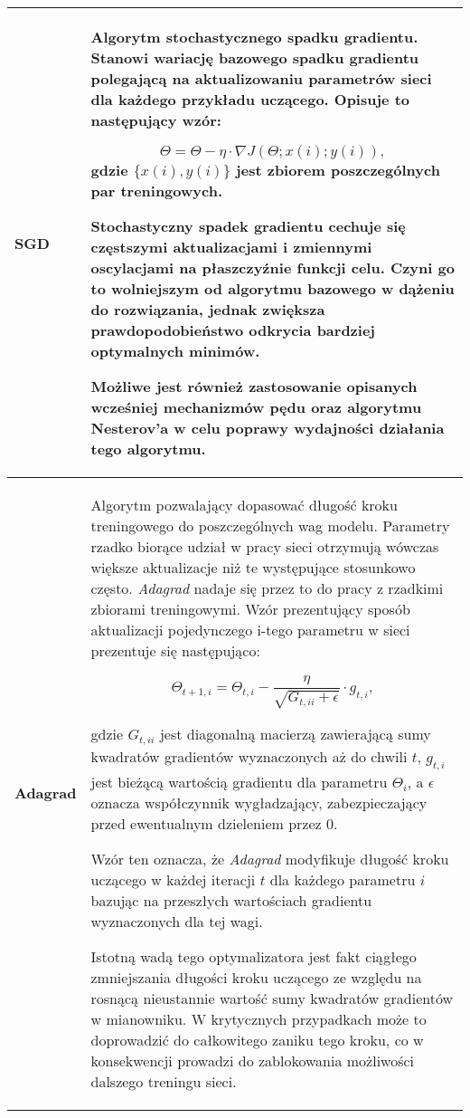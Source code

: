 \begin{enumerate}
\begin{longtable}{ |m{3cm}|m{10cm}| }
     \hline
       \textbf{SGD \cite{SGD}} &

       Algorytm stochastycznego spadku gradientu. Stanowi wariację bazowego spadku
       gradientu polegającą na aktualizowaniu parametrów sieci dla
       każdego przykładu uczącego. Opisuje to następujący wzór:

       \[\Theta = \Theta - \eta \cdot \nabla J(\Theta;x(i);y(i)),\]
       gdzie $\{x(i), y(i)\}$ jest zbiorem poszczególnych par treningowych.

       Stochastyczny spadek gradientu cechuje się częstszymi aktualizacjami i
       zmiennymi oscylacjami na płaszczyźnie funkcji celu. Czyni go to wolniejszym od
       algorytmu bazowego w dążeniu do rozwiązania, jednak zwiększa prawdopodobieństwo odkrycia
       bardziej optymalnych minimów.

       Możliwe jest również zastosowanie opisanych wcześniej mechanizmów pędu oraz
       algorytmu Nesterov'a w celu poprawy wydajności działania tego algorytmu. \\

     \hline
       \textbf{Adagrad \cite{Adagrad}} &

        Algorytm pozwalający dopasować długość kroku treningowego do poszczególnych
        wag modelu. Parametry rzadko biorące udział w pracy sieci otrzymują wówczas
        większe aktualizacje niż te występujące stosunkowo często. \textit{Adagrad} nadaje się
        przez to do pracy z rzadkimi zbiorami treningowymi. Wzór prezentujący sposób aktualizacji
        pojedynczego i-tego parametru w sieci prezentuje się następująco:

        \[\Theta_{t+1,i} = \Theta_{t,i} - \frac{\eta}{\sqrt{G_{t,ii} + \epsilon}} \cdot g_{t,i},\]

        gdzie $G_{t,ii}$ jest diagonalną macierzą zawierającą sumy kwadratów gradientów
        wyznaczonych aż do chwili $t$, $g_{t,i}$ jest bieżącą wartością gradientu dla parametru $\Theta_i$, a
        $\epsilon$ oznacza współczynnik wygładzający, zabezpieczający przed ewentualnym dzieleniem
        przez 0.

        Wzór ten oznacza, że \textit{Adagrad} modyfikuje długość kroku uczącego w każdej iteracji $t$
        dla każdego parametru $i$ bazując na przeszłych wartościach gradientu wyznaczonych
        dla tej wagi.

        Istotną wadą tego optymalizatora jest fakt ciągłego zmniejszania długości
        kroku uczącego ze względu na rosnącą nieustannie wartość sumy kwadratów
        gradientów w mianowniku. W krytycznych przypadkach może to doprowadzić
        do całkowitego zaniku tego kroku, co w konsekwencji prowadzi do
        zablokowania możliwości dalszego treningu sieci. \\


\end{longtable}
\end{enumerate}
